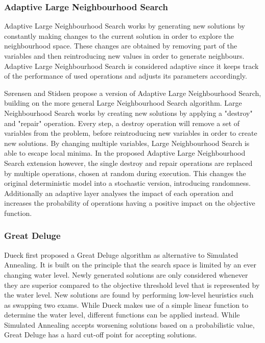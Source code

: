 \subsubsection{Adaptive Large Neighbourhood Search}

Adaptive Large Neighbourhood Search \cite{ropke2006} works by generating new solutions by constantly making changes to the current solution in order to explore the neighbourhood space. These changes are obtained by removing part of the variables and then reintroducing new values in order to generate neighbours. Adaptive Large Neighbourhood Search is considered adaptive since it keeps track of the performance of used operations and adjusts its parameters accordingly. 

S{\o}rensen and Stidsen \cite{sorensen2012} propose a version of Adaptive Large Neighbourhood Search, building on the more general Large Neighbourhood Search algorithm. Large Neighbourhood Search works by creating new solutions by applying a "destroy" and "repair" operation. Every step, a destroy operation will remove a set of variables from the problem, before reintroducing new variables in order to create new solutions. By changing multiple variables, Large Neighbourhood Search is able to escape local minima. In the proposed Adaptive Large Neighbourhood Search extension however, the single destroy and repair operations are replaced by multiple operations, chosen at random during execution. This changes the original deterministic model into a stochastic version, introducing randomness. Additionally an adaptive layer analyses the impact of each operation and increases the probability of operations having a positive impact on the objective function.

\subsubsection{Great Deluge}

Dueck \cite{dueck1993} first proposed a Great Deluge algorithm as alternative to Simulated Annealing. It is built on the principle that the search space is limited by an ever changing water level. Newly generated solutions are only considered whenever they are superior compared to the objective threshold level that is represented by the water level. New solutions are found by performing low-level heuristics such as swapping two exams. While Dueck makes use of a simple linear function to determine the water level, different functions can be applied instead. While Simulated Annealing accepts worsening solutions based on a probabilistic value, Great Deluge has a hard cut-off point for accepting solutions. 

